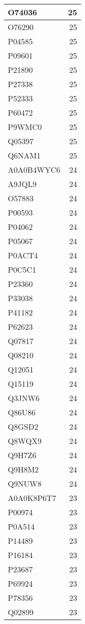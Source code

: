 \documentclass[
]{book}
\theoremstyle{definition}
\theoremstyle{definition}
\theoremstyle{definition}
\theoremstyle{definition}
\theoremstyle{remark}
\begin{document}
\begin{table}
\begin{tabular}{l|r}
\hline
O74036 & 25\\
\hline
O76290 & 25\\
\hline
P04585 & 25\\
\hline
P09601 & 25\\
\hline
P21890 & 25\\
\hline
P27338 & 25\\
\hline
P52333 & 25\\
\hline
P60472 & 25\\
\hline
P9WMC0 & 25\\
\hline
Q05397 & 25\\
\hline
Q6NAM1 & 25\\
\hline
A0A0B4WYC6 & 24\\
\hline
A9JQL9 & 24\\
\hline
O57883 & 24\\
\hline
P00593 & 24\\
\hline
P04062 & 24\\
\hline
P05067 & 24\\
\hline
P0ACT4 & 24\\
\hline
P0C5C1 & 24\\
\hline
P23360 & 24\\
\hline
P33038 & 24\\
\hline
P41182 & 24\\
\hline
P62623 & 24\\
\hline
Q07817 & 24\\
\hline
Q08210 & 24\\
\hline
Q12051 & 24\\
\hline
Q15119 & 24\\
\hline
Q3JNW6 & 24\\
\hline
Q86U86 & 24\\
\hline
Q8GSD2 & 24\\
\hline
Q8WQX9 & 24\\
\hline
Q9H7Z6 & 24\\
\hline
Q9H8M2 & 24\\
\hline
Q9NUW8 & 24\\
\hline
A0A0K8P6T7 & 23\\
\hline
P00974 & 23\\
\hline
P0A514 & 23\\
\hline
P14489 & 23\\
\hline
P16184 & 23\\
\hline
P23687 & 23\\
\hline
P69924 & 23\\
\hline
P78356 & 23\\
\hline
Q02899 & 23\\

\end{tabular}
\end{table}
\end{document}
